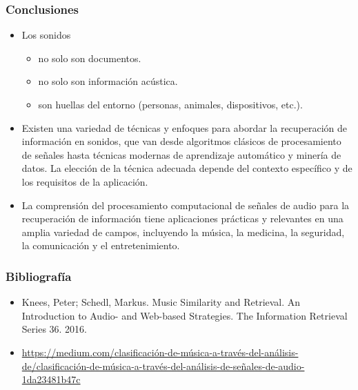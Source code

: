 \documentclass[
10pt, %
aspectratio=169, %
]{beamer}
\begin{document}
	\begin{frame}
		
		\frametitle{Conclusiones}
		
		\begin{itemize}
			\item Los sonidos 
			\begin{itemize}
				\item no solo son documentos.
				\item no solo son información acústica.
				\item  son huellas del entorno (personas, animales, dispositivos, etc.).
			\end{itemize}
			
			\vspace{1\baselineskip}
			
			\item Existen una variedad de técnicas y enfoques para abordar la recuperación de información en sonidos, que van desde algoritmos clásicos de procesamiento de señales hasta técnicas modernas de aprendizaje automático y minería de datos. La elección de la técnica adecuada depende del contexto específico y de los requisitos de la aplicación.
			
			\vspace{1\baselineskip}
						
			\item La comprensión del procesamiento computacional de señales de audio para la recuperación de información tiene aplicaciones prácticas y relevantes en una amplia variedad de campos, incluyendo la música, la medicina, la seguridad, la comunicación y el entretenimiento.
			
		\end{itemize}
		
	\end{frame}
	
	\begin{frame}
		
		\frametitle{Bibliografía}
		
		\begin{itemize}
			\item Knees, Peter; Schedl, Markus. Music Similarity and Retrieval. An Introduction to Audio- and Web-based Strategies. The Information Retrieval Series 36. 2016.
			
			\item \url{https://medium.com/clasificación-de-música-a-través-del-análisis-de/clasificación-de-música-a-través-del-análisis-de-señales-de-audio-1da23481b47c}
			
		\end{itemize}
		
	\end{frame}
	
	\begin{frame}
		\titlepage
	\end{frame}
	
	
	
\end{document}
